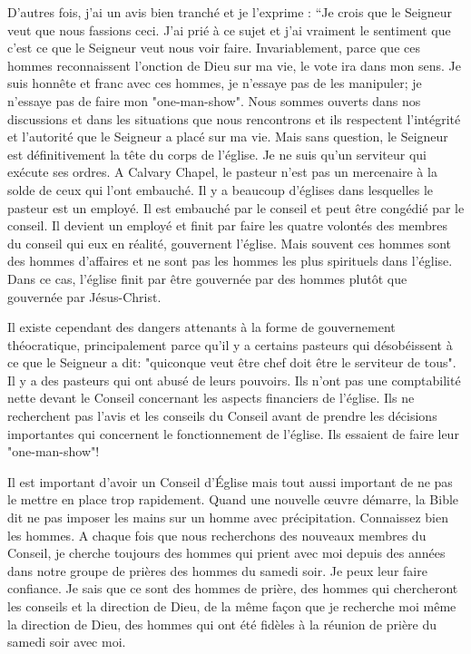 D’autres fois, j’ai un avis bien tranché et je l’exprime : “Je crois que le Seigneur veut que nous fassions ceci. J’ai prié à
ce sujet et j’ai vraiment le sentiment que c’est ce que le Seigneur veut nous voir faire. Invariablement, parce que ces
hommes reconnaissent l’onction de Dieu sur ma vie, le vote ira dans mon sens. Je suis honnête et franc avec ces
hommes, je n’essaye pas de les manipuler; je n’essaye pas de faire mon "one-man-show". Nous sommes ouverts
dans nos discussions et dans les situations que nous rencontrons et ils respectent l’intégrité et l’autorité que le
Seigneur a placé sur ma vie. Mais sans question, le Seigneur est définitivement la tête du corps de l’église. Je ne suis
qu’un serviteur qui exécute ses ordres. A Calvary Chapel, le pasteur n’est pas un mercenaire à la solde de ceux qui
l'ont embauché. Il y a beaucoup d’églises dans lesquelles le pasteur est un employé. Il est embauché par le conseil et
peut être congédié par le conseil. Il devient un employé et finit par faire les quatre volontés des membres du conseil
qui eux en réalité, gouvernent l’église. Mais souvent ces hommes sont des hommes d’affaires et ne sont pas les
hommes les plus spirituels dans l’église. Dans ce cas, l’église finit par être gouvernée par des hommes plutôt que
gouvernée par Jésus-Christ.

Il existe cependant des dangers attenants à la forme de gouvernement théocratique, principalement parce qu’il y a
certains pasteurs qui désobéissent à ce que le Seigneur a dit: "quiconque veut être chef doit être le serviteur de
tous". Il y a des pasteurs qui ont abusé de leurs pouvoirs. Ils n’ont pas une comptabilité nette devant le Conseil
concernant les aspects financiers de l’église. Ils ne recherchent pas l’avis et les conseils du Conseil avant de prendre
les décisions importantes qui concernent le fonctionnement de l’église. Ils essaient de faire leur "one-man-show"!

Il est important d’avoir un Conseil d’Église mais tout aussi important de ne pas le mettre en place trop rapidement.
Quand une nouvelle œuvre démarre, la Bible dit ne pas imposer les mains sur un homme avec précipitation.
Connaissez bien les hommes. A chaque fois que nous recherchons des nouveaux membres du Conseil, je cherche
toujours des hommes qui prient avec moi depuis des années dans notre groupe de prières des hommes du samedi
soir. Je peux leur faire confiance. Je sais que ce sont des hommes de prière, des hommes qui chercheront les conseils
et la direction de Dieu, de la même façon que je recherche moi même la direction de Dieu, des hommes qui ont été
fidèles à la réunion de prière du samedi soir avec moi.

